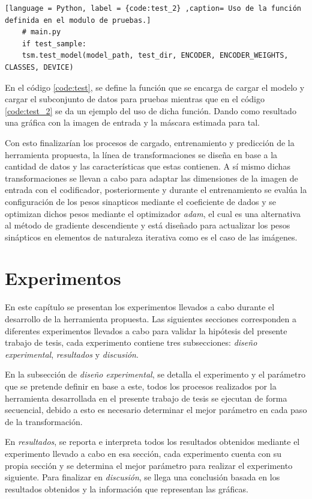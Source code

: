 \begin{lstlisting}[language = Python, label = {code:test_2} ,caption= Uso de la función definida en el modulo de pruebas.]
    # main.py
    if test_sample:
    tsm.test_model(model_path, test_dir, ENCODER, ENCODER_WEIGHTS, CLASSES, DEVICE)
\end{lstlisting}

En el código \ref{code:test}, se define la función que se encarga de cargar el modelo y cargar el subconjunto de datos para pruebas mientras que en el código \ref{code:test_2} se da un ejemplo del uso de dicha función. Dando como resultado una gráfica con la imagen de entrada y la máscara estimada para tal.

Con esto finalizarían los procesos de cargado, entrenamiento y predicción de la herramienta propuesta, la línea de transformaciones se diseña en base a la cantidad de datos y las características que estas contienen. A sí mismo dichas transformaciones se llevan a cabo para adaptar las dimensiones de la imagen de entrada con el codificador, posteriormente y durante el entrenamiento se evalúa la configuración de los pesos sinapticos mediante el coeficiente de dados y se optimizan dichos pesos mediante el optimizador \emph{adam}, el cual es una alternativa al método de gradiente descendiente y está diseñado para actualizar los pesos sinápticos en elementos de naturaleza iterativa como es el caso de las imágenes. 



\chapter{Experimentos}
En este capítulo se presentan los experimentos llevados a cabo durante el desarrollo de la herramienta propuesta. Las siguientes secciones corresponden a diferentes experimentos llevados a cabo para validar la hipótesis del presente trabajo de tesis, cada experimento contiene tres subsecciones: \emph{diseño experimental}, \emph{resultados} y \emph{discusión}.

En la subsección de \emph{diseño experimental}, se detalla el experimento y el parámetro que se pretende definir en base a este, todos los procesos realizados por la herramienta desarrollada en el presente trabajo de tesis se ejecutan de forma secuencial, debido a esto es necesario determinar el mejor parámetro en cada paso de la transformación.

En \emph{resultados}, se reporta e interpreta todos los resultados obtenidos mediante el experimento llevado a cabo en esa sección, cada experimento cuenta con su propia sección y se determina el mejor parámetro para realizar el experimento siguiente. Para finalizar en \emph{discusión}, se llega una conclusión basada en los resultados obtenidos y la información que representan las gráficas.


